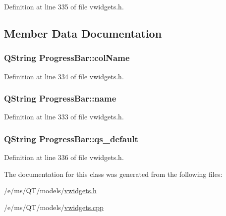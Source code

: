 Definition at line 335 of file vwidgets.h.



\subsection{Member Data Documentation}
\hypertarget{classProgressBar_a01f6641a949f427f14e9549e483225a1}{
\subsubsection[{colName}]{\setlength{\rightskip}{0pt plus 5cm}QString {\bf ProgressBar::colName}}}
\label{classProgressBar_a01f6641a949f427f14e9549e483225a1}


Definition at line 334 of file vwidgets.h.

\hypertarget{classProgressBar_af25531dd99ab1c50f0433322055a1756}{
\subsubsection[{name}]{\setlength{\rightskip}{0pt plus 5cm}QString {\bf ProgressBar::name}}}
\label{classProgressBar_af25531dd99ab1c50f0433322055a1756}


Definition at line 333 of file vwidgets.h.

\hypertarget{classProgressBar_a88c614233c1940b74d034073fe81b592}{
\subsubsection[{qs\_\-default}]{\setlength{\rightskip}{0pt plus 5cm}QString {\bf ProgressBar::qs\_\-default}}}
\label{classProgressBar_a88c614233c1940b74d034073fe81b592}


Definition at line 336 of file vwidgets.h.



The documentation for this class was generated from the following files:\begin{DoxyCompactItemize}
\item 
/e/ms/QT/models/\hyperlink{vwidgets_8h}{vwidgets.h}\item 
/e/ms/QT/models/\hyperlink{vwidgets_8cpp}{vwidgets.cpp}\end{DoxyCompactItemize}
